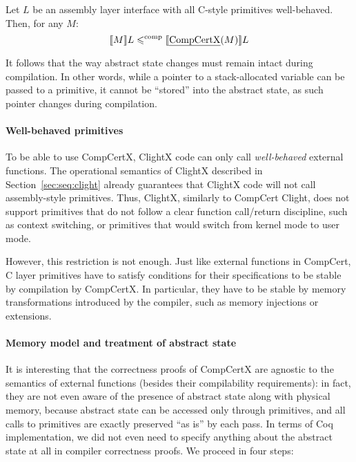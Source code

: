 \begin{theorem}
\label{theorem:compcorect}
Let $L$ be an assembly layer interface with all C-style primitives
well-behaved. Then, for any $M$:
\[
\llbracket M \rrbracket L \leqslant^{\textrm{comp}} \llbracket \textrm{\emph{CompCertX}}(M) \rrbracket L
\]
\end{theorem}




It follows that the way abstract state changes must remain intact during
compilation.
In other words, while a pointer to a stack-allocated
variable can be passed to a primitive, it cannot be ``stored'' into
the abstract state, as such pointer changes during compilation.

\paragraph{Well-behaved primitives}

To be able to use CompCertX, ClightX code can only call
\emph{well-behaved} external functions. The operational semantics of
ClightX described in Section~\ref{sec:seq:clight} already
guarantees that ClightX code will not call assembly-style primitives. Thus,
ClightX, similarly to CompCert Clight, does not support primitives
that do not follow a clear function call/return discipline, such as
context switching, or primitives that would switch from kernel mode to
user mode.

However, this restriction is not enough. Just like external functions
in CompCert, C layer primitives have to satisfy conditions for their
specifications to be stable by compilation by CompCertX. In
particular, they have to be stable by memory transformations
introduced by the compiler, such as memory injections or extensions.



\paragraph{Memory model and treatment of abstract state}

It is interesting that the correctness proofs  of CompCertX are agnostic to
the semantics of external functions (besides their compilability
requirements): in fact, they are not even aware of the presence of
abstract state along with physical memory, because abstract state can
be accessed only through primitives, and all calls to primitives are
exactly preserved ``as is'' by each pass. In terms of Coq
implementation, we did not even need to specify anything about the
abstract state at all in compiler correctness proofs. We proceed in four steps:

